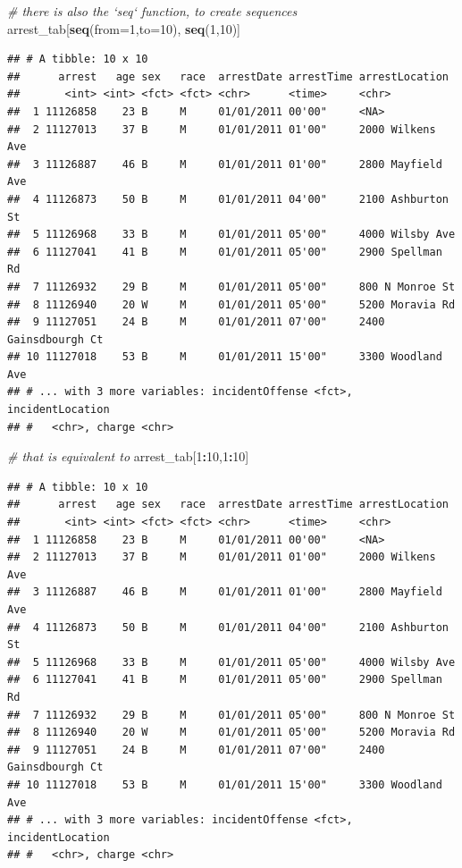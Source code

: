\documentclass[12pt,]{book}
\newenvironment{Shaded}{\begin{snugshade}}{\end{snugshade}}
\newcommand{\KeywordTok}[1]{\textcolor[rgb]{0.13,0.29,0.53}{\textbf{#1}}}
\newcommand{\DataTypeTok}[1]{\textcolor[rgb]{0.13,0.29,0.53}{#1}}
\newcommand{\DecValTok}[1]{\textcolor[rgb]{0.00,0.00,0.81}{#1}}
\newcommand{\CommentTok}[1]{\textcolor[rgb]{0.56,0.35,0.01}{\textit{#1}}}
\newcommand{\OperatorTok}[1]{\textcolor[rgb]{0.81,0.36,0.00}{\textbf{#1}}}
\newcommand{\NormalTok}[1]{#1}
\theoremstyle{definition}
\theoremstyle{definition}
\theoremstyle{definition}
\theoremstyle{remark}
\begin{document}
\begin{Shaded}
\begin{Highlighting}[]
\CommentTok{# there is also the `seq` function, to create sequences}
\NormalTok{arrest_tab[}\KeywordTok{seq}\NormalTok{(}\DataTypeTok{from=}\DecValTok{1}\NormalTok{,}\DataTypeTok{to=}\DecValTok{10}\NormalTok{), }\KeywordTok{seq}\NormalTok{(}\DecValTok{1}\NormalTok{,}\DecValTok{10}\NormalTok{)]}
\end{Highlighting}
\end{Shaded}

\begin{verbatim}
## # A tibble: 10 x 10
##      arrest   age sex   race  arrestDate arrestTime arrestLocation      
##       <int> <int> <fct> <fct> <chr>      <time>     <chr>               
##  1 11126858    23 B     M     01/01/2011 00'00"     <NA>                
##  2 11127013    37 B     M     01/01/2011 01'00"     2000 Wilkens Ave    
##  3 11126887    46 B     M     01/01/2011 01'00"     2800 Mayfield Ave   
##  4 11126873    50 B     M     01/01/2011 04'00"     2100 Ashburton St   
##  5 11126968    33 B     M     01/01/2011 05'00"     4000 Wilsby Ave     
##  6 11127041    41 B     M     01/01/2011 05'00"     2900 Spellman Rd    
##  7 11126932    29 B     M     01/01/2011 05'00"     800 N Monroe St     
##  8 11126940    20 W     M     01/01/2011 05'00"     5200 Moravia Rd     
##  9 11127051    24 B     M     01/01/2011 07'00"     2400 Gainsdbourgh Ct
## 10 11127018    53 B     M     01/01/2011 15'00"     3300 Woodland Ave   
## # ... with 3 more variables: incidentOffense <fct>, incidentLocation
## #   <chr>, charge <chr>
\end{verbatim}

\begin{Shaded}
\begin{Highlighting}[]
\CommentTok{# that is equivalent to }
\NormalTok{arrest_tab[}\DecValTok{1}\OperatorTok{:}\DecValTok{10}\NormalTok{,}\DecValTok{1}\OperatorTok{:}\DecValTok{10}\NormalTok{]}
\end{Highlighting}
\end{Shaded}

\begin{verbatim}
## # A tibble: 10 x 10
##      arrest   age sex   race  arrestDate arrestTime arrestLocation      
##       <int> <int> <fct> <fct> <chr>      <time>     <chr>               
##  1 11126858    23 B     M     01/01/2011 00'00"     <NA>                
##  2 11127013    37 B     M     01/01/2011 01'00"     2000 Wilkens Ave    
##  3 11126887    46 B     M     01/01/2011 01'00"     2800 Mayfield Ave   
##  4 11126873    50 B     M     01/01/2011 04'00"     2100 Ashburton St   
##  5 11126968    33 B     M     01/01/2011 05'00"     4000 Wilsby Ave     
##  6 11127041    41 B     M     01/01/2011 05'00"     2900 Spellman Rd    
##  7 11126932    29 B     M     01/01/2011 05'00"     800 N Monroe St     
##  8 11126940    20 W     M     01/01/2011 05'00"     5200 Moravia Rd     
##  9 11127051    24 B     M     01/01/2011 07'00"     2400 Gainsdbourgh Ct
## 10 11127018    53 B     M     01/01/2011 15'00"     3300 Woodland Ave   
## # ... with 3 more variables: incidentOffense <fct>, incidentLocation
## #   <chr>, charge <chr>
\end{verbatim}
\end{document}
